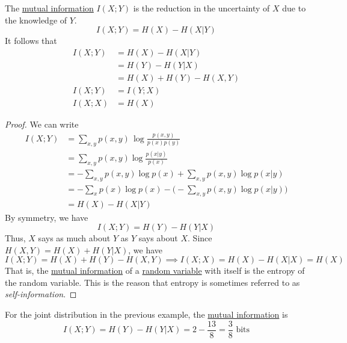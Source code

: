   \begin{theorem}
    \label{thm:mutual-information-and-entropy}
    The \hyperref[def:mutual-information]{mutual information} $I(X;Y)$ is the reduction in the uncertainty of $X$ due to the knowledge of $Y$. 
    \begin{equation}
      I(X;Y) = H(X) - H(X|Y)
    \end{equation}
    It follows that
    \begin{align*}
      I(X;Y) & = H(X) - H(X|Y) \\
      & = H(Y) - H(Y|X) \\
      & = H(X) + H(Y) - H(X, Y) \\
      I(X;Y) & = I(Y;X) \\
      I(X;X) & = H(X)
    \end{align*}
  \end{theorem}
  \begin{proof}
    We can write
    \begin{align*}
      I(X;Y) & = \sum_{x, y} p(x, y) \, \log \frac{p(x, y)}{p(x)p(y)} \\
      & = \sum_{x, y} p(x, y) \log \frac{p(x|y)}{p(x)} \\
      & = - \sum_{x, y} p(x, y) \log p(x) + \sum_{x, y} p(x, y) \log p(x|y) \\
      & = - \sum_x p(x) \log p(x) - \Bigg( - \sum_{x, y} p(x, y) \log p(x|y) \Bigg) \\
      & = H(X) - H(X|Y)
    \end{align*}
    By symmetry, we have
    \begin{equation}
      I(X;Y) = H(Y) - H(Y|X)
    \end{equation}
    Thus, $X$ says as much about $Y$ as $Y$ says about $X$. Since $H(X, Y) = H(X) + H(Y|X)$, we have
    \begin{equation}
      I(X;Y) = H(X) + H(Y) - H(X, Y) \implies I(X;X) = H(X) - H(X|X) = H(X)
    \end{equation}
    That is, the \hyperref[def:mutual-information]{mutual information} of a \hyperref[prob-def:random-variable]{random variable} with itself is the entropy of the random variable. This is the reason that entropy is sometimes referred to as \textit{self-information}. 
  \end{proof}

  \begin{example}
    \label{ex:mutual-information-of-a-joint-distribution}
    For the joint distribution in the previous example, the \hyperref[def:mutual-information]{mutual information} is 
    \begin{equation}
      I(X;Y) = H(Y) - H(Y|X) = 2 - \frac{13}{8} = \frac{3}{8} \text{ bits}
    \end{equation}
  \end{example}

